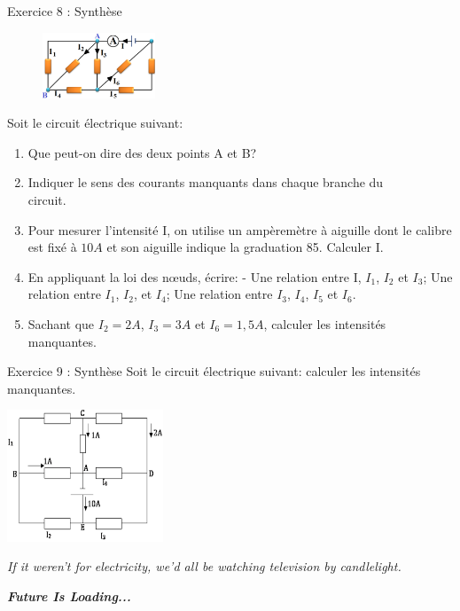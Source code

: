 \documentclass[12pt, french]{article}
\begin{document}
\begin{Box2}{Exercice 8 : Synthèse  }
	\begin{figure}
  \begin{center}
	  \vspace{-0.6cm}
	\includegraphics[width=0.3\textwidth]{./img/ex08.png}
  \end{center}
\end{figure}
Soit le circuit électrique suivant:
\begin{enumerate}
	\item Que peut-on dire des deux points A et B?
	\item  Indiquer le sens des courants manquants
dans chaque branche du \\circuit.
\item  Pour mesurer l’intensité I, on utilise un
ampèremètre à aiguille dont le calibre est
fixé à $10 A$ et son aiguille indique la
graduation 85. Calculer I.
\item En appliquant la loi des nœuds, écrire: - Une
relation entre I, $I_1$, $I_2$ et $I_3$; Une relation entre
$I_1$, $I_2$, et $I_4$; Une relation entre $I_3$, $I_4$, $I_5$ et $I_6$.
\item  Sachant que $I_2 = 2 A$, $I_3 = 3 A$ et $I_6 = 1,5 A$, calculer les intensités manquantes.
\end{enumerate}
\end{Box2}


\begin{Box2}{Exercice 9 : Synthèse  }
	Soit le circuit électrique suivant: calculer les intensités manquantes.
  \begin{center}
	\includegraphics[width=0.35\textwidth]{./img/ex09.png}
  \end{center}


\end{Box2}



\begin{center}
	\emph{If it weren't for electricity, we'd all be watching television by candlelight.}

	\emph{\textbf{Future Is Loading...}}

\end{center}
\end{document}
